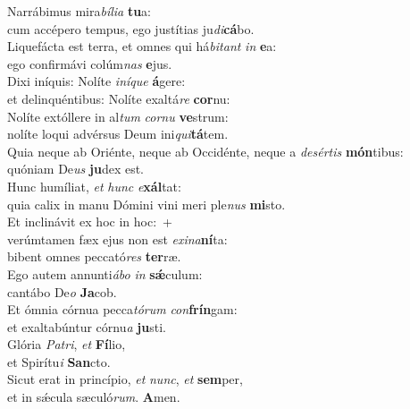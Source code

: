 \evenverse Narrábimus mira\textit{bí}\textit{li}\textit{a} \textbf{tu}a:~\*\\
\evenverse cum accépero tempus, ego justítias ju\textit{di}\textbf{cá}bo.\\
\oddverse Liquefácta est terra, et omnes qui há\textit{bi}\textit{tant} \textit{in} \textbf{e}a:~\*\\
\oddverse ego confirmávi colúm\textit{nas} \textbf{e}jus.\\
\evenverse Dixi iníquis: Nolíte \textit{i}\textit{ní}\textit{que} \textbf{á}gere:~\*\\
\evenverse et delinquéntibus: Nolíte exaltá\textit{re} \textbf{cor}nu:\\
\oddverse Nolíte extóllere in al\textit{tum} \textit{cor}\textit{nu} \textbf{ve}strum:~\*\\
\oddverse nolíte loqui advérsus Deum ini\textit{qui}\textbf{tá}tem.\\
\evenverse Quia neque ab Oriénte, neque ab Occidénte, neque a \textit{de}\textit{sér}\textit{tis} \textbf{món}tibus:~\*\\
\evenverse quóniam De\textit{us} \textbf{ju}dex est.\\
\oddverse Hunc humíliat, \textit{et} \textit{hunc} \textit{e}\textbf{xál}tat:~\*\\
\oddverse quia calix in manu Dómini vini meri ple\textit{nus} \textbf{mi}sto.\\
\evenverse Et inclinávit ex hoc in hoc:~+\\
\evenverse  verúmtamen fæx ejus non est \textit{e}\textit{xi}\textit{na}\textbf{ní}ta:~\*\\
\evenverse bibent omnes peccató\textit{res} \textbf{ter}ræ.\\
\oddverse Ego autem annunti\textit{á}\textit{bo} \textit{in} \textbf{sǽ}culum:~\*\\
\oddverse cantábo De\textit{o} \textbf{Ja}cob.\\
\evenverse Et ómnia córnua pecca\textit{tó}\textit{rum} \textit{con}\textbf{frín}gam:~\*\\
\evenverse et exaltabúntur córnu\textit{a} \textbf{ju}sti.\\
\oddverse Glória \textit{Pa}\textit{tri}, \textit{et} \textbf{Fí}lio,~\*\\
\oddverse et Spirítu\textit{i} \textbf{San}cto.\\
\evenverse Sicut erat in princípio, \textit{et} \textit{nunc}, \textit{et} \textbf{sem}per,~\*\\
\evenverse et in sǽcula sæculó\textit{rum}. \textbf{A}men.\\
